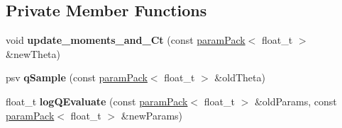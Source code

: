 \subsection*{Private Member Functions}
\begin{DoxyCompactItemize}
\item 
\mbox{\label{classada__pmmh__mvn_ac02d38688740c1379a852f2d07a8ea0a}} 
void {\bfseries update\+\_\+moments\+\_\+and\+\_\+\+Ct} (const \hyperlink{classparamPack}{param\+Pack}$<$ float\+\_\+t $>$ \&new\+Theta)
\item 
\mbox{\label{classada__pmmh__mvn_a8ffbe9f38347905cd2549778a04d5ddf}} 
psv {\bfseries q\+Sample} (const \hyperlink{classparamPack}{param\+Pack}$<$ float\+\_\+t $>$ \&old\+Theta)
\item 
\mbox{\label{classada__pmmh__mvn_a2fb402251d938f5ec20754a84029bad2}} 
float\+\_\+t {\bfseries log\+Q\+Evaluate} (const \hyperlink{classparamPack}{param\+Pack}$<$ float\+\_\+t $>$ \&old\+Params, const \hyperlink{classparamPack}{param\+Pack}$<$ float\+\_\+t $>$ \&new\+Params)
\end{DoxyCompactItemize}
